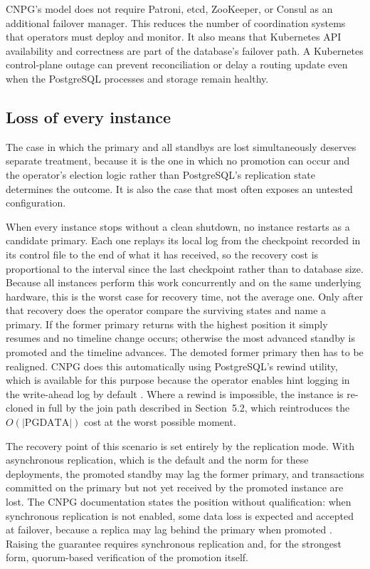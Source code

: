 \documentclass[11pt,a4paper]{article}
\begin{document}
CNPG's model does not require Patroni, etcd, ZooKeeper, or Consul as an additional failover manager. This reduces the number of coordination systems that operators must deploy and monitor. It also means that Kubernetes API availability and correctness are part of the database's failover path. A Kubernetes control-plane outage can prevent reconciliation or delay a routing update even when the PostgreSQL processes and storage remain healthy.

\subsection{Loss of every instance}

The case in which the primary and all standbys are lost simultaneously deserves separate treatment, because it is the one in which no promotion can occur and the operator's election logic rather than PostgreSQL's replication state determines the outcome. It is also the case that most often exposes an untested configuration.

When every instance stops without a clean shutdown, no instance restarts as a candidate primary. Each one replays its local log from the checkpoint recorded in its control file to the end of what it has received, so the recovery cost is proportional to the interval since the last checkpoint rather than to database size. Because all instances perform this work concurrently and on the same underlying hardware, this is the worst case for recovery time, not the average one. Only after that recovery does the operator compare the surviving states and name a primary. If the former primary returns with the highest position it simply resumes and no timeline change occurs; otherwise the most advanced standby is promoted and the timeline advances. The demoted former primary then has to be realigned. CNPG does this automatically using PostgreSQL's rewind utility, which is available for this purpose because the operator enables hint logging in the write-ahead log by default \cite{cnpg-faq,pg-rewind}. Where a rewind is impossible, the instance is re-cloned in full by the join path described in Section~5.2, which reintroduces the $O(\lvert\mathrm{PGDATA}\rvert)$ cost at the worst possible moment.

The recovery point of this scenario is set entirely by the replication mode. With asynchronous replication, which is the default and the norm for these deployments, the promoted standby may lag the former primary, and transactions committed on the primary but not yet received by the promoted instance are lost. The CNPG documentation states the position without qualification: when synchronous replication is not enabled, some data loss is expected and accepted at failover, because a replica may lag behind the primary when promoted \cite{cnpg-failover}. Raising the guarantee requires synchronous replication and, for the strongest form, quorum-based verification of the promotion itself.
\end{document}
